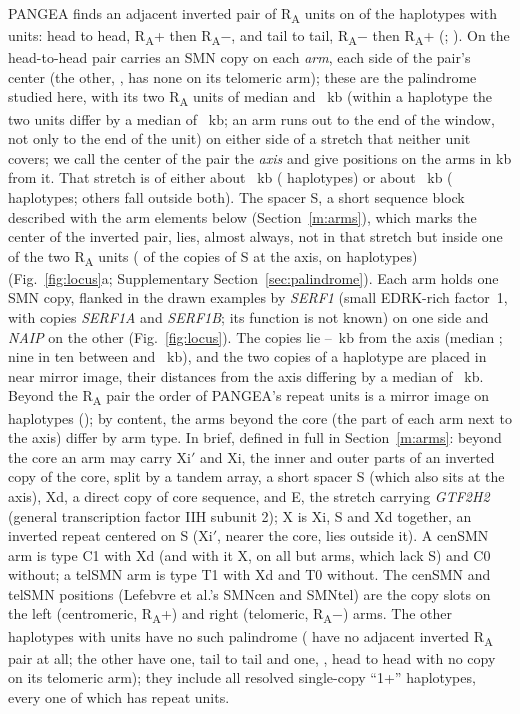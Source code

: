 \documentclass[10pt]{article}
\newcommand{\RU}[1]{R\textsubscript{#1}}%
\begin{document}
PANGEA finds an adjacent inverted pair of \RU{A} units on \palAdj{} of the \palHaps{} haplotypes with units: \palHead{} head to head, \RU{A}+ then \RU{A}$-$, and \palTail{} tail to tail, \RU{A}$-$ then \RU{A}+ (\palTailHaps; \palTailArr). On \palPair{} the head-to-head pair carries an SMN copy on each \emph{arm}, each side of the pair's center (the other, \palNoCopyHap, has none on its telomeric arm); these \palPair{} are the palindrome studied here, with its two \RU{A} units of median \palArmL{} and \palArmR{}~kb (within a haplotype the two units differ by a median of \palArmDiff~kb; an arm runs out to the end of the window, not only to the end of the unit) on either side of a
stretch that neither unit covers; we call the center of the pair the \emph{axis} and give positions on the arms in kb from it. That stretch is of either about \palGapShort~kb (\palGapShortN{} haplotypes) or about \palGapLong~kb (\palGapLongN{} haplotypes; \palGapOtherN{} others fall outside both). The spacer S, a short sequence block described with the arm elements below (Section~\ref{m:arms}), which marks the center of the inverted pair, lies, almost always, not in that stretch but inside one of the two \RU{A} units (\palSinA{} of the \palGapSN{} copies of S at the axis, on \palGapSHaps{} haplotypes) (Fig.~\ref{fig:locus}a; Supplementary Section~\ref{sec:palindrome}). Each arm holds one SMN
copy, flanked in the drawn examples by \emph{SERF1} (small EDRK-rich factor~1, with copies \emph{SERF1A} and \emph{SERF1B}; its function is not known) on one side and \emph{NAIP} on the other (Fig.~\ref{fig:locus}). The copies lie
\palDmin--\palDmax~kb from the axis (median \palDmed; nine in ten between \palDlo{} and \palDhi~kb), and the two copies of a haplotype are placed in near mirror image,
their distances from the axis differing by a median of \palMirror~kb. Beyond the \RU{A} pair the order of PANGEA's repeat units is a mirror image on
\palDeeper{} haplotypes (\palDeeperHap); by content, the arms beyond the core (the part of each arm next to the axis) differ by arm type. In brief, defined in full in Section~\ref{m:arms}: beyond the core an arm may carry Xi$'$ and Xi, the inner and outer parts of an inverted copy of the core, split by a tandem array, a short spacer S (which also sits at the axis), Xd, a direct copy of core sequence, and E, the stretch carrying \emph{GTF2H2} (general transcription factor IIH subunit 2); X is Xi, S and Xd together, an inverted repeat centered on S (Xi$'$, nearer the core, lies outside it). A cenSMN arm is type C1 with Xd (and with it X, on all but \xcNoS{} arms, which lack S) and C0 without; a telSMN arm is type T1 with Xd and T0 without. The cenSMN and telSMN positions (Lefebvre et al.'s SMNcen and SMNtel) are the copy slots on the left
(centromeric, \RU{A}+) and right (telomeric, \RU{A}$-$) arms. The other \palNoPair{} haplotypes with units have no such palindrome (\palNoAdj{} have no adjacent inverted \RU{A} pair at all; the other \palAdjNotPal{} have one, \palTail{} tail to tail and one, \palNoCopyHap, head to head with no copy on its telomeric arm); they include all \palNoOne{} resolved single-copy ``1+'' haplotypes, every one of which has repeat units.
\end{document}

